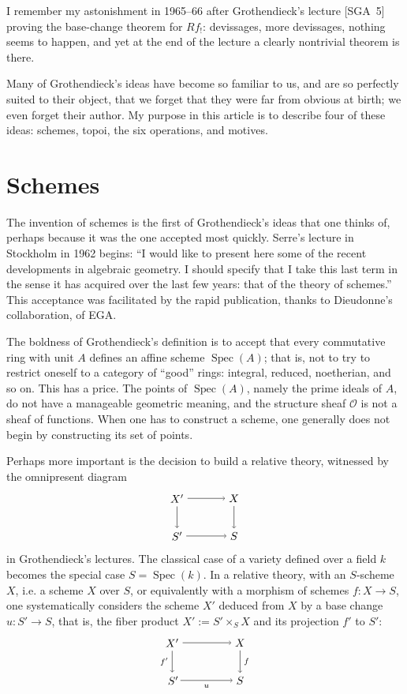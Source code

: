 \documentclass[11pt,a4paper]{article}
\theoremstyle{plain}
\theoremstyle{definition}
\DeclareMathOperator{\Spec}{Spec}
\begin{document}
I remember my astonishment in 1965--66 after Grothendieck's lecture [SGA~5] proving the base-change theorem for $Rf_!$: devissages, more devissages, nothing seems to happen, and yet at the end of the lecture a clearly nontrivial theorem is there.

Many of Grothendieck's ideas have become so familiar to us, and are so perfectly suited to their object, that we forget that they were far from obvious at birth; we even forget their author. My purpose in this article is to describe four of these ideas: schemes, topoi, the six operations, and motives.

\section{Schemes}

The invention of schemes is the first of Grothendieck's ideas that one thinks of, perhaps because it was the one accepted most quickly. Serre's lecture in Stockholm in 1962 begins: ``I would like to present here some of the recent developments in algebraic geometry. I should specify that I take this last term in the sense it has acquired over the last few years: that of the theory of schemes.'' This acceptance was facilitated by the rapid publication, thanks to Dieudonne's collaboration, of EGA.

The boldness of Grothendieck's definition is to accept that every commutative ring with unit $A$ defines an affine scheme $\Spec(A)$; that is, not to try to restrict oneself to a category of ``good'' rings: integral, reduced, noetherian, and so on. This has a price. The points of $\Spec(A)$, namely the prime ideals of $A$, do not have a manageable geometric meaning, and the structure sheaf $\mathcal{O}$ is not a sheaf of functions. When one has to construct a scheme, one generally does not begin by constructing its set of points.

Perhaps more important is the decision to build a relative theory, witnessed by the omnipresent diagram
\[
\begin{tikzpicture}[baseline=-0.5ex,scale=1.2]
\node (X') at (0,1) {$X'$};
\node (X) at (1.5,1) {$X$};
\node (S') at (0,0) {$S'$};
\node (S) at (1.5,0) {$S$};
\draw[->] (X') -- (X);
\draw[->] (X') -- (S');
\draw[->] (X) -- (S);
\draw[->] (S') -- (S);
\end{tikzpicture}
\]
in Grothendieck's lectures. The classical case of a variety defined over a field $k$ becomes the special case $S=\Spec(k)$. In a relative theory, with an $S$-scheme $X$, i.e. a scheme $X$ over $S$, or equivalently with a morphism of schemes $f:X\to S$, one systematically considers the scheme $X'$ deduced from $X$ by a base change $u:S'\to S$, that is, the fiber product $X':=S'\times_S X$ and its projection $f'$ to $S'$:
\[
\begin{tikzpicture}[baseline=-0.5ex,scale=1.2]
\node (X') at (0,1) {$X'$};
\node (X) at (1.8,1) {$X$};
\node (S') at (0,0) {$S'\!$};
\node (S) at (1.8,0) {$S$};
\draw[->] (X') -- (X);
\draw[->] (X') -- (S') node[midway,left] {$\scriptstyle f'$};
\draw[->] (X) -- (S) node[midway,right] {$\scriptstyle f$};
\draw[->] (S') -- (S) node[midway,below] {$\scriptstyle u$};
\end{tikzpicture}
\]
\end{document}
